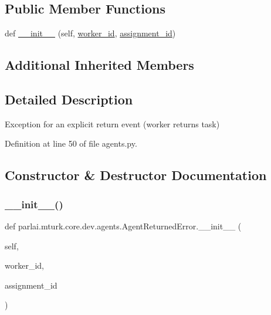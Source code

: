 \subsection*{Public Member Functions}
\begin{DoxyCompactItemize}
\item 
def \hyperlink{classparlai_1_1mturk_1_1core_1_1dev_1_1agents_1_1AgentReturnedError_a95885f02dee5d24bdff9b82f90730061}{\+\_\+\+\_\+init\+\_\+\+\_\+} (self, \hyperlink{classparlai_1_1mturk_1_1core_1_1dev_1_1agents_1_1AbsentAgentError_a26db50c87a5d4954907d538de3da875c}{worker\+\_\+id}, \hyperlink{classparlai_1_1mturk_1_1core_1_1dev_1_1agents_1_1AbsentAgentError_ab9cf020196d28024b307c41a3fff6be1}{assignment\+\_\+id})
\end{DoxyCompactItemize}
\subsection*{Additional Inherited Members}


\subsection{Detailed Description}
\begin{DoxyVerb}Exception for an explicit return event (worker returns task)
\end{DoxyVerb}
 

Definition at line 50 of file agents.\+py.



\subsection{Constructor \& Destructor Documentation}
\mbox{\label{classparlai_1_1mturk_1_1core_1_1dev_1_1agents_1_1AgentReturnedError_a95885f02dee5d24bdff9b82f90730061}} 
\subsubsection{\texorpdfstring{\+\_\+\+\_\+init\+\_\+\+\_\+()}{\_\_init\_\_()}}
{\footnotesize\ttfamily def parlai.\+mturk.\+core.\+dev.\+agents.\+Agent\+Returned\+Error.\+\_\+\+\_\+init\+\_\+\+\_\+ (\begin{DoxyParamCaption}\item[{}]{self,  }\item[{}]{worker\+\_\+id,  }\item[{}]{assignment\+\_\+id }\end{DoxyParamCaption})}




